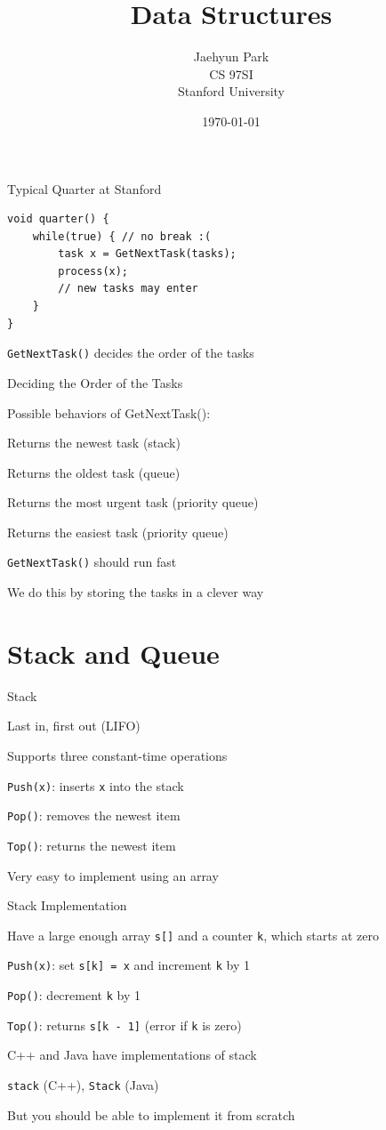 \documentclass[13pt,onlymath]{beamer}
\title{\large \bfseries Data Structures}
\author{Jaehyun Park\\[3ex]
CS 97SI\\
Stanford University}
\date{\today}
\begin{document}
\frame{
\thispagestyle{empty}
\titlepage
}

\begin{frame}[fragile]{Typical Quarter at Stanford}
\begin{Verbatim}[xleftmargin=25pt]
void quarter() {
    while(true) { // no break :(
        task x = GetNextTask(tasks);
        process(x);
        // new tasks may enter
    }
}
\end{Verbatim}
\BIT
\item \verb,GetNextTask(), decides the order of the tasks
\EIT
\end{frame}

\begin{frame}[fragile]{Deciding the Order of the Tasks}
\BIT
\item Possible behaviors of GetNextTask():
\BIT
\item Returns the newest task (stack)
\item Returns the oldest task (queue)
\item Returns the most urgent task (priority queue)
\item Returns the easiest task (priority queue)
\EIT
\vfill
\item \verb,GetNextTask(), should run fast
\BIT
\item We do this by storing the tasks in a clever way
\EIT
\EIT
\end{frame}

\section{Stack and Queue}

\begin{frame}[fragile]{Stack}
\BIT
\item Last in, first out (LIFO)
\item Supports three constant-time operations
\BIT
\item \verb,Push(x),: inserts \verb,x, into the stack
\item \verb,Pop(),: removes the newest item
\item \verb,Top(),: returns the newest item
\EIT
\vfill
\item Very easy to implement using an array
\EIT
\end{frame}

\begin{frame}[fragile]{Stack Implementation}
\BIT
\item Have a large enough array \verb,s[], and a counter \verb,k,, which starts at zero
\BIT
\item \verb,Push(x),: set \verb,s[k] = x, and increment \verb,k, by 1
\item \verb,Pop(),: decrement \verb,k, by 1
\item \verb,Top(),: returns \verb,s[k - 1], (error if \verb,k, is zero)
\EIT
\item C++ and Java have implementations of stack
\BIT
\item \verb,stack, (C++), \verb,Stack, (Java)
\EIT
\item But you should be able to implement it from scratch
\EIT
\end{frame}
\end{document}
